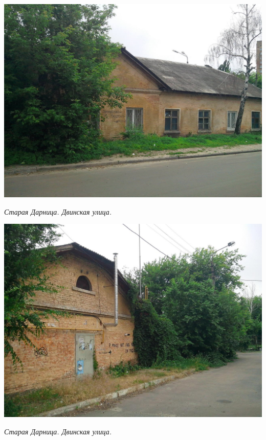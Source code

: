 \begin{center}
\includegraphics[width=\linewidth]{lpix/IMG_20160613_140440.jpg}

\textit{Старая Дарница. Двинская улица.}
\end{center}


\begin{center}
\includegraphics[width=\linewidth]{lpix/IMG_20160613_140656.jpg}

\textit{Старая Дарница. Двинская улица.}
\end{center}


